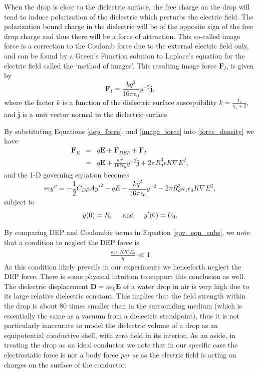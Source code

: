 \documentclass[12pt,a4paper,oneside]{book}
\begin{document}
When the drop is close to the dielectric surface, the free charge on the drop will tend to induce polarization of the dielectric which perturbs the electric field. The polarization bound charge in the dielectric will be of the opposite sign of the free drop charge and thus there will be a force of attraction. This so-called image force is a correction to the Coulomb force due to the external electric field only, and can be found by a Green's Function solution to Laplace's equation for the electric field called the `method of images'\cite{david_j._griffiths_introduction_1999}. This resulting image force $\mathbf{F}_I$, is given by
\begin{equation}
\mathbf{F}_I = \frac{k q^2}{16 \pi \epsilon_0} y^{-2} \hat{\mathbf{j}},
\label{image_force}
\end{equation}
where the factor $k$ is a function of the dielectric surface susceptibility $k = \frac{\chi_e}{\chi_e + 2}$, and $\hat{\mathbf{j}}$ is a unit vector normal to the dielectric surface.

By substituting Equations \ref{dep_force}, and \ref{image_force} into \ref{force_density} we have
\begin{eqnarray*}
 \mathbf{F}_E &=& q \mathbf{E} + \mathbf{F}_{DEP} + \mathbf{F}_I \\
 &=& q \mathbf{E} + \frac{k q^2}{16 \pi \epsilon_0 } y^{-2} \hat{\mathbf{j}} + 2 \pi R_d^3 \epsilon K \nabla E^2, 
\end{eqnarray*}
and the 1-D governing equation becomes
\begin{equation}
 \label{gov_eqn_subs}
m y'' = - \frac{1}{2} C_D \rho A {y'}^2 - q E - \frac{k q^2}{16 \pi \epsilon_0} y^{-2}- 2 \pi R_d^3 \kappa_1 \epsilon_0 K \nabla E^2,
\end{equation}
subject to
\begin{equation}
y(0) = R, \hspace{5 mm} \mbox{and} \hspace{5 mm} y'(0) = U_0 .
\end{equation}

By comparing DEP and Coulombic terms in Equation \ref{gov_eqn_subs}, we note that a condition to neglect the DEP force is
\begin{eqnarray}
\frac{ \kappa_2 \epsilon_0 K R_d^2 E_0}{q} \ll 1 \nonumber
\end{eqnarray}
As this condition likely prevails in our experiments we henceforth neglect the DEP force. There is some physical intuition to support this conclusion as well. The dielectric displacement $\mathbf{D} = \kappa \epsilon_0 \mathbf{E}$ of a water drop in air is very high due to its large relative dielectric constant. This implies that the field strength within the drop is about 80 times smaller than in the surrounding medium (which is essentially the same as a vacuum from a dielectric standpoint), thus it is not particularly inaccurate to model the dielectric volume of a drop as an equipotential conductive shell, with zero field in its interior. As an aside, in treating the drop as an ideal conductor we note that in our specific case the electrostatic force is not a body force \emph{per se} as the electric field is acting on charges on the surface of the conductor.
\end{document}
